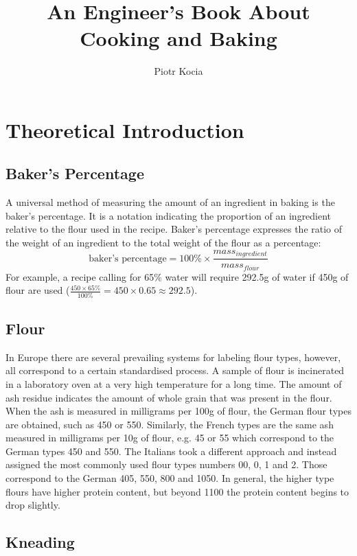 \documentclass[11pt]{report}
\title{An Engineer's Book About Cooking and Baking}
\author{Piotr Kocia}
\begin{document}
\maketitle
\tableofcontents

\newpage

\chapter{Theoretical Introduction}

\section{Baker's Percentage}
A universal method of measuring the amount of an ingredient in baking is the
baker's percentage. It is a notation indicating the proportion of an ingredient
relative to the flour used in the recipe. Baker's percentage expresses the
ratio of the weight of an ingredient to the total weight of the flour as a
percentage:
$$
\textrm{baker's percentage} = 100\% \times \frac{ mass_{ingredient} }{ mass_{flour} }
$$
For example, a recipe calling for 65\% water will require 292.5g of water if
450g of flour are used ($\frac{450 \times 65\%}{100\%} = 450 \times 0.65
\approx 292.5$).

\section{Flour}
In Europe there are several prevailing systems for labeling flour types,
however, all correspond to a certain standardised process. A sample of flour is
incinerated in a laboratory oven at a very high temperature for a long time.
The amount of ash residue indicates the amount of whole grain that was present
in the flour. When the ash is measured in milligrams per 100g of flour, the
German flour types are obtained, such as 450 or 550. Similarly, the French
types are the same ash measured in milligrams per 10g of flour, e.g. 45 or 55
which correspond to the German types 450 and 550. The Italians took a different
approach and instead assigned the most commonly used flour types numbers 00, 0,
1 and 2. Those correspond to the German 405, 550, 800 and 1050. In general, the
higher type flours have higher protein content, but beyond 1100 the protein
content begins to drop slightly.

\section{Kneading}
\end{document}
